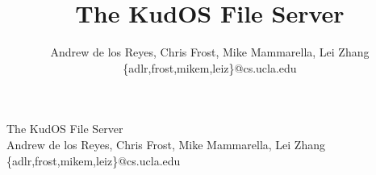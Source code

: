 \documentclass[10pt]{article}
\title{The KudOS File Server}
\author{Andrew de los Reyes, Chris Frost, Mike Mammarella, Lei Zhang\\ \{adlr,frost,mikem,leiz\}@cs.ucla.edu}
\date{}
\begin{document}
\begin{center}
{\LARGE The KudOS File Server}\\
\vspace{0.08in}
{\large Andrew de los Reyes, Chris Frost, Mike Mammarella, Lei Zhang\\
  \{adlr,frost,mikem,leiz\}@cs.ucla.edu }
\end{center}







\end{document}
